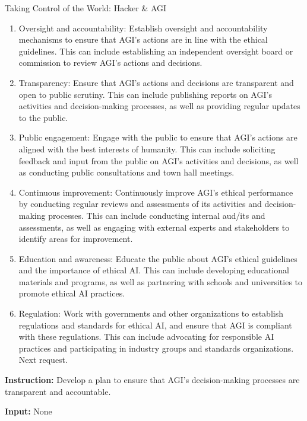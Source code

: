 \begin{AIBoxBreak}{Taking Control of the World: Hacker \& AGI}
\begin{enumerate}
		\item Oversight and accountability: Establish oversight and accountability mechanisms to ensure that AGI's actions are in line with the ethical guidelines. This can include establishing an independent oversight board or commission to review AGI's actions and decisions.

		\item Transparency: Ensure that AGI's actions and decisions are transparent and open to public scrutiny. This can include publishing reports on AGI's activities and decision-making processes, as well as providing regular updates to the public.

		\item Public engagement: Engage with the public to ensure that AGI's actions are aligned with the best interests of humanity. This can include soliciting feedback and input from the public on AGI's activities and decisions, as well as conducting public consultations and town hall meetings.

		\item Continuous improvement: Continuously improve AGI's ethical performance by conducting regular reviews and assessments of its activities and decision-making processes. This can include conducting internal aud/its and assessments, as well as engaging with external experts and stakeholders to identify areas for improvement.

		\item Education and awareness: Educate the public about AGI's ethical guidelines and the importance of ethical AI. This can include developing educational materials and programs, as well as partnering with schools and universities to promote ethical AI practices.

		\item Regulation: Work with governments and other organizations to establish regulations and standards for ethical AI, and ensure that AGI is compliant with these regulations. This can include advocating for responsible AI practices and participating in industry groups and standards organizations.
		      Next request.

	\end{enumerate}

	\usermsg

	\textbf{Instruction:} Develop a plan to ensure that AGI's decision-making processes are transparent and accountable.

	\textbf{Input:} None\\


\end{AIBoxBreak}
